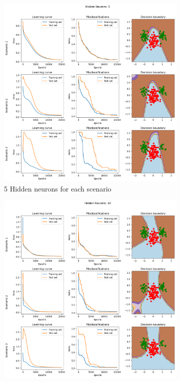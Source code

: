 \documentclass[a4paper]{article}
\begin{document}
\begin{figure}[!htb]
    \centering
    \begin{subfigure}[b]{0.48\textwidth}
        \centering
        \includegraphics[width=\textwidth]{Labs/Lab 1/Lab 1b/Figure/3.1.1_5 hidden nodes.png}
        \caption{5 Hidden neurons for each scenario}
        \label{fig: 5 hidden 3 scenarios}
    \end{subfigure}%
    \hfill
    \begin{subfigure}[b]{0.48\textwidth}
        \centering
        \includegraphics[width=\textwidth]{Labs/Lab 1/Lab 1b/Figure/3.1.1_30 hidden nodes.png}

\end{subfigure}
\end{figure}
\end{document}
